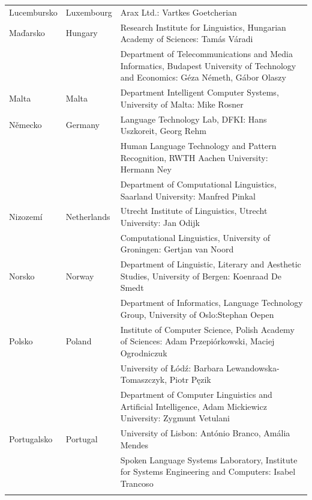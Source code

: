 \begin{longtable}{@{}llp{113mm}@{}}
    Lucembursko & \textcolor{grey1}{Luxembourg} & Arax Ltd.: Vartkes Goetcherian\\ \addlinespace
Maďarsko & \textcolor{grey1}{Hungary} & Research Institute for Linguistics, Hungarian Academy of Sciences: Tamás Váradi\\  \addlinespace
  & & Department of Telecommunications and Media Informatics, Budapest University of Technology and Economics: Géza Németh, Gábor Olaszy\\ \addlinespace
  Malta & \textcolor{grey1}{Malta} & Department Intelligent Computer Systems, University of Malta: Mike Rosner\\ \addlinespace
  Německo & \textcolor{grey1}{Germany} & Language Technology Lab, DFKI: Hans Uszkoreit, Georg Rehm\\ \addlinespace
  & & Human Language Technology and Pattern Recognition, RWTH Aachen University: Hermann Ney \\ \addlinespace
  & & Department of Computational Linguistics, Saarland University: Manfred Pinkal\\ \addlinespace 
  Nizozemí & \textcolor{grey1}{Netherlands} & Utrecht Institute of Linguistics, Utrecht University: Jan Odijk\\ \addlinespace 
  & & Computational Linguistics, University of Groningen: Gertjan van Noord\\ \addlinespace
  Norsko & \textcolor{grey1}{Norway} & Department of Linguistic, Literary and Aesthetic Studies, University of Bergen: Koenraad De Smedt\\ \addlinespace 
  & & Department of Informatics, Language Technology Group, University of Oslo:\newline Stephan Oepen \\ \addlinespace
  Polsko & \textcolor{grey1}{Poland} & Institute of Computer Science, Polish Academy of Sciences: Adam Przepiórkowski, Maciej Ogrodniczuk \\ \addlinespace
  & & University of Łódź: Barbara Lewandowska-Tomaszczyk, Piotr Pęzik\\ \addlinespace
  & & Department of Computer Linguistics and Artificial Intelligence, Adam Mickiewicz University: Zygmunt Vetulani \\ \addlinespace
  Portugalsko & \textcolor{grey1}{Portugal} & University of Lisbon: António Branco, Amália Mendes \\ \addlinespace
  & & Spoken Language Systems Laboratory, Institute for Systems Engineering and Computers: Isabel Trancoso \\ \addlinespace

\end{longtable}
